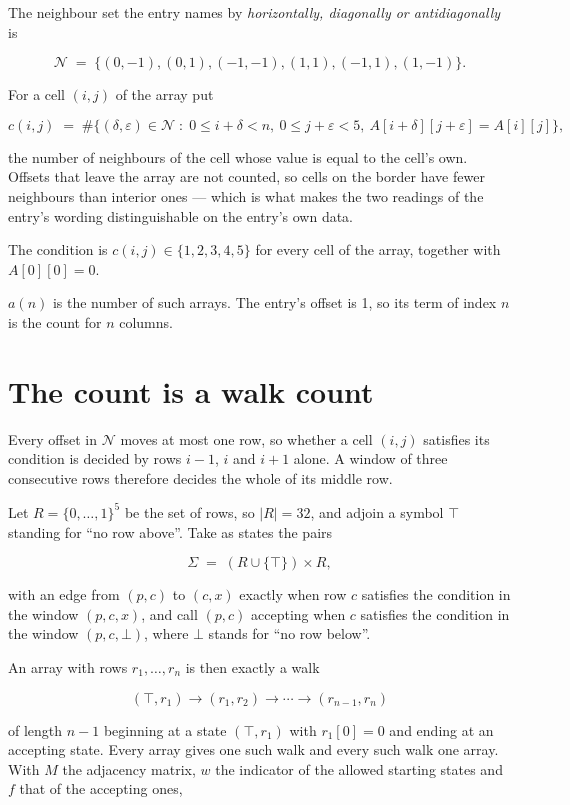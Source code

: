 \documentclass[11pt]{article}
\theoremstyle{definition}
\begin{document}
The neighbour set the entry names by {\itshape horizontally, diagonally or antidiagonally} is

\[\mathcal{N} \;=\; \{(0,-1), (0,1), (-1,-1), (1,1), (-1,1), (1,-1)\}.\]

For a cell $(i,j)$ of the array put

\[c(i,j) \;=\; \#\bigl\{(\delta,\varepsilon)\in\mathcal{N} \;:\; 0\le i+\delta<n,\ 0\le j+\varepsilon<5,\ A[i+\delta][j+\varepsilon] = A[i][j]\bigr\},\]

the number of neighbours of the cell whose value is equal to the cell's own. Offsets that leave the array are not counted, so cells on the border have fewer neighbours than interior ones --- which is what makes the two readings of the entry's wording distinguishable on the entry's own data.

The condition is $c(i,j) \in \{1, 2, 3, 4, 5\}$ for every cell of the array, together with $A[0][0]=0$.

$a(n)$ is the number of such arrays. The entry's offset is 1, so its term of index $n$ is the count for $n$ columns.

\section{The count is a walk count}

Every offset in $\mathcal{N}$ moves at most one row, so whether a cell $(i,j)$ satisfies its condition is decided by rows $i-1$, $i$ and $i+1$ alone. A window of three consecutive rows therefore decides the whole of its middle row.

Let $R = \{0,\dots,1\}^{5}$ be the set of rows, so $|R| = 32$, and adjoin a symbol $\top$ standing for ``no row above''. Take as states the pairs

\[\Sigma \;=\; (R \cup \{\top\}) \times R,\]

with an edge from $(p,c)$ to $(c,x)$ exactly when row $c$ satisfies the condition in the window $(p,c,x)$, and call $(p,c)$ accepting when $c$ satisfies the condition in the window $(p,c,\bot)$, where $\bot$ stands for ``no row below''.

An array with rows $r_1,\dots,r_n$ is then exactly a walk

\[(\top,r_1) \to (r_1,r_2) \to \cdots \to (r_{n-1},r_n)\]

of length $n-1$ beginning at a state $(\top,r_1)$ with $r_1[0]=0$ and ending at an accepting state. Every array gives one such walk and every such walk one array. With $M$ the adjacency matrix, $w$ the indicator of the allowed starting states and $f$ that of the accepting ones,
\end{document}
